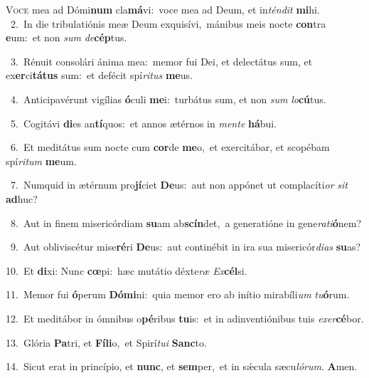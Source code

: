 \lettrine{\initial\textcolor{\initialcolor}{V}}{oce} mea ad Dómi\textbf{num} cla\-\textbf{má}\-vi:~\star voce mea ad Deum, et in\-\textit{tén}\-\textit{dit} \textbf{mi}\-hi.\\
{\numbfont\textcolor{\numbcolor}{~2.}}~In die tribulatiónis meæ Deum exquisívi,~\dagger mánibus meis nocte \textbf{con}\-tra \textbf{e}\-um:~\star et non \textit{sum} \textit{de}\-\textbf{cép}tus.\par
{\numbfont\textcolor{\numbcolor}{~3.}}~Rénuit consolári ánima mea:~\dagger memor fui Dei, et delectátus sum, et ex\-\textbf{er}\-ci\-\textbf{tá}\-\textbf{tus} sum:~\star et defécit spí\-\textit{ri}\-\textit{tus} \textbf{me}\-us.\par
{\numbfont\textcolor{\numbcolor}{~4.}}~Anticipavérunt vigílias \textbf{ó}\-culi \textbf{me}\-i:~\star turbátus sum, et non \textit{sum} \textit{lo}\-\textbf{cú}tus.\par
{\numbfont\textcolor{\numbcolor}{~5.}}~Cogitávi \textbf{di}\-es an\-\textbf{tí}\-quos:~\star et annos ætérnos in \textit{men}\-\textit{te} \textbf{há}\-bui.\par
{\numbfont\textcolor{\numbcolor}{~6.}}~Et meditátus sum nocte cum \textbf{cor}\-de \textbf{me}\-o,~\star et exercitábar, et scopébam spí\-\textit{ri}\-\textit{tum} \textbf{me}\-um.\par
{\numbfont\textcolor{\numbcolor}{~7.}}~Numquid in ætérnum pro\-\textbf{jí}\-ciet \textbf{De}\-us:~\star aut non appónet ut complacíti\textit{or} \textit{sit} \textbf{ad}\-huc?\par
{\numbfont\textcolor{\numbcolor}{~8.}}~Aut in finem misericórdiam \textbf{su}\-am ab\-\textbf{scín}\-det,~\star a generatióne in gene\-\textit{ra}\-\textit{ti}\textbf{ó}nem?\par
{\numbfont\textcolor{\numbcolor}{~9.}}~Aut obliviscétur mise\-\textbf{ré}\-ri \textbf{De}\-us:~\star aut continébit in ira sua misericór\-\textit{di}\-\textit{as} \textbf{su}\-as?\par
{\numbfont\textcolor{\numbcolor}{10.}}~Et \textbf{di}\-xi: Nunc \textbf{cœ}\-pi:~\star hæc mutátio déxte\textit{ræ} \textit{Ex}\-\textbf{cél}si.\par
{\numbfont\textcolor{\numbcolor}{11.}}~Memor fui \textbf{ó}\-perum \textbf{Dó}\-\textbf{mi}ni:~\star quia memor ero ab inítio mirabíli\textit{um} \textit{tu}\-\textbf{ó}rum.\par
{\numbfont\textcolor{\numbcolor}{12.}}~Et meditábor in ómnibus o\-\textbf{pé}\-ribus \textbf{tu}\-is:~\star et in adinventiónibus tuis \textit{ex}\-\textit{er}\textbf{cé}bor.\par
{\numbfont\textcolor{\numbcolor}{13.}}~Glória \textbf{Pa}\-tri, et \textbf{Fí}\-\textbf{li}o,~\star et Spirí\-\textit{tu}\-\textit{i} \textbf{Sanc}\-to.\par
{\numbfont\textcolor{\numbcolor}{14.}}~Sicut erat in princípio, et \textbf{nunc}\-, et \textbf{sem}\-per,~\star et in sǽcula sæcu\-\textit{ló}\-\textit{rum}. \textbf{A}\-men.\par
